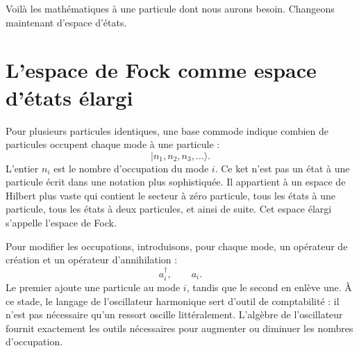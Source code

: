 \begin{classroomqa}
\end{classroomqa}

Voilà les mathématiques à une particule dont nous aurons besoin. Changeons maintenant d’espace d’états.

\section{L’espace de Fock comme espace d’états élargi}

Pour plusieurs particules identiques, une base commode indique combien de particules occupent chaque mode à une particule :
\begin{equation}
|n_1,n_2,n_3,\ldots\rangle.
\label{eq:l07-fock-basis}
\end{equation}
L’entier \(n_i\) est le nombre d’occupation du mode \(i\). Ce ket n’est pas un état à une particule écrit dans une notation plus sophistiquée. Il appartient à un espace de Hilbert plus vaste qui contient le secteur à zéro particule, tous les états à une particule, tous les états à deux particules, et ainsi de suite. Cet espace élargi s’appelle l’espace de Fock.

Pour modifier les occupations, introduisons, pour chaque mode, un opérateur de création et un opérateur d’annihilation :
\begin{equation}
a_i^\dagger,\qquad a_i.
\end{equation}
Le premier ajoute une particule au mode \(i\), tandis que le second en enlève une. À ce stade, le langage de l’oscillateur harmonique sert d’outil de comptabilité : il n’est pas nécessaire qu’un ressort oscille littéralement. L’algèbre de l’oscillateur fournit exactement les outils nécessaires pour augmenter ou diminuer les nombres d’occupation.


